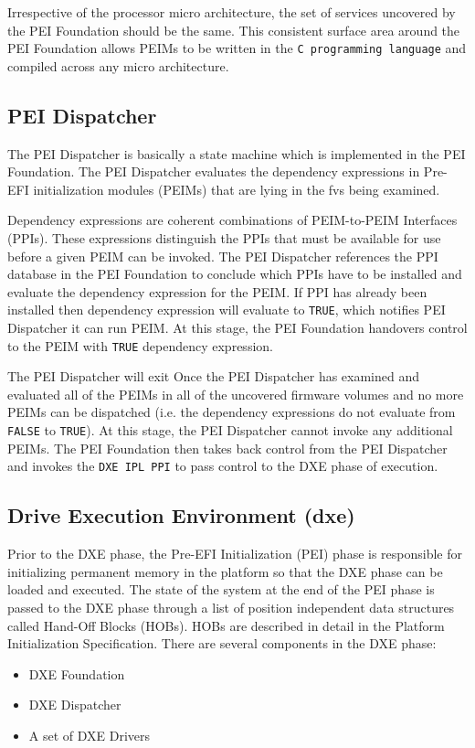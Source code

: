Irrespective of the processor micro architecture, the set of services uncovered by the PEI Foundation should be the same. This consistent surface area around the PEI Foundation allows PEIMs to be written in the \verb|C programming language| and compiled across any micro architecture.

\subsection{PEI Dispatcher}
The PEI Dispatcher is basically a state machine which is implemented in the PEI Foundation. The PEI Dispatcher evaluates the dependency expressions in Pre-EFI initialization modules (PEIMs) that are lying in the \gls{fv}s being examined.

Dependency expressions are coherent combinations of PEIM-to-PEIM Interfaces (PPIs). These expressions distinguish the PPIs that must be available for use before a given PEIM can be invoked. The PEI Dispatcher references the PPI database in the PEI Foundation to conclude which PPIs have to be installed and evaluate the dependency expression for the PEIM. If PPI has already been installed then dependency expression will evaluate to \verb|TRUE|, which notifies  PEI Dispatcher it can run PEIM. At this stage, the PEI Foundation handovers control to the PEIM with \verb|TRUE| dependency expression. 

The PEI Dispatcher will exit Once the PEI Dispatcher has examined and evaluated all of the PEIMs in all of the uncovered firmware volumes and no more PEIMs can be dispatched (i.e. the dependency expressions do not evaluate from \verb|FALSE| to \verb|TRUE|). At this stage, the PEI Dispatcher cannot invoke any additional PEIMs. The PEI Foundation then takes back control from the PEI Dispatcher and invokes the \verb|DXE IPL PPI| to pass control to the DXE phase of execution.

\subsection{Drive Execution Environment (\gls{dxe})}
Prior to the DXE phase, the Pre-EFI Initialization (PEI) phase is responsible for initializing permanent memory in the platform so that the DXE phase can be loaded and executed. The state of the system at the end of the PEI phase is passed to the DXE phase through a list of position independent data structures called Hand-Off Blocks (HOBs). HOBs are described in detail in the Platform Initialization Specification.
There are several components in the DXE phase:
\begin{itemize}
	\item DXE Foundation
	\item DXE Dispatcher
	\item A set of DXE Drivers
\end{itemize}

